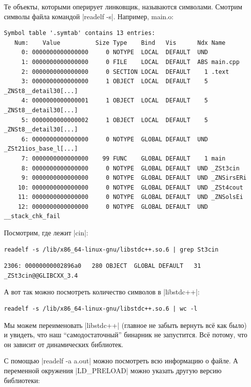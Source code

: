 \documentclass[11pt]{article}
\begin{document}
Те объекты, которыми оперирует линковщик, называются символами. Смотрим символы
файла командой \nolint|readelf -s|. Например, main.o:

\begin{lstlisting}
Symbol table '.symtab' contains 13 entries:
   Num:    Value          Size Type    Bind   Vis      Ndx Name
     0: 0000000000000000     0 NOTYPE  LOCAL  DEFAULT  UND
     1: 0000000000000000     0 FILE    LOCAL  DEFAULT  ABS main.cpp
     2: 0000000000000000     0 SECTION LOCAL  DEFAULT    1 .text
     3: 0000000000000000     1 OBJECT  LOCAL  DEFAULT    5 _ZNSt8__detail30[...]
     4: 0000000000000001     1 OBJECT  LOCAL  DEFAULT    5 _ZNSt8__detail30[...]
     5: 0000000000000002     1 OBJECT  LOCAL  DEFAULT    5 _ZNSt8__detail30[...]
     6: 0000000000000000     0 NOTYPE  GLOBAL DEFAULT  UND _ZSt21ios_base_l[...]
     7: 0000000000000000    99 FUNC    GLOBAL DEFAULT    1 main
     8: 0000000000000000     0 NOTYPE  GLOBAL DEFAULT  UND _ZSt3cin
     9: 0000000000000000     0 NOTYPE  GLOBAL DEFAULT  UND _ZNSirsERi
    10: 0000000000000000     0 NOTYPE  GLOBAL DEFAULT  UND _ZSt4cout
    11: 0000000000000000     0 NOTYPE  GLOBAL DEFAULT  UND _ZNSolsEi
    12: 0000000000000000     0 NOTYPE  GLOBAL DEFAULT  UND __stack_chk_fail
\end{lstlisting}

\newpage

Посмотрим, где лежит \nolint|cin|:

\begin{lstlisting}
readelf -s /lib/x86_64-linux-gnu/libstdc++.so.6 | grep St3cin
\end{lstlisting}

\begin{lstlisting}
2306: 00000000002896a0   280 OBJECT  GLOBAL DEFAULT   31 _ZSt3cin@@GLIBCXX_3.4
\end{lstlisting}

А вот так можно посмотреть количество символов в \nolint|libstdc++|:

\begin{lstlisting}
readelf -s /lib/x86_64-linux-gnu/libstdc++.so.6 | wc -l
\end{lstlisting}

Мы можем переименовать \nolint|libstdc++| (главное не забыть вернуть всё как
было) и увидеть, что наш ``самодостаточный'' бинарник не запустится. Всё потому,
что он зависит от динамических библиотек.

С помощью \nolint|readelf -a a.out| можно посмотреть всю
информацию о файле. А переменной окружения \nolint|LD_PRELOAD| можно указать
другую версию библиотеки:
\end{document}
